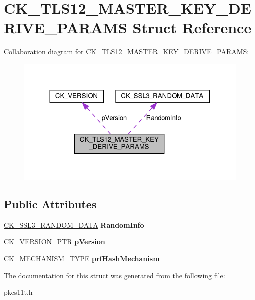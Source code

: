 \hypertarget{struct_c_k___t_l_s12___m_a_s_t_e_r___k_e_y___d_e_r_i_v_e___p_a_r_a_m_s}{}\section{C\+K\+\_\+\+T\+L\+S12\+\_\+\+M\+A\+S\+T\+E\+R\+\_\+\+K\+E\+Y\+\_\+\+D\+E\+R\+I\+V\+E\+\_\+\+P\+A\+R\+A\+MS Struct Reference}
\label{struct_c_k___t_l_s12___m_a_s_t_e_r___k_e_y___d_e_r_i_v_e___p_a_r_a_m_s}


Collaboration diagram for C\+K\+\_\+\+T\+L\+S12\+\_\+\+M\+A\+S\+T\+E\+R\+\_\+\+K\+E\+Y\+\_\+\+D\+E\+R\+I\+V\+E\+\_\+\+P\+A\+R\+A\+MS\+:
\nopagebreak
\begin{figure}[H]
\begin{center}
\leavevmode
\includegraphics[width=324pt]{struct_c_k___t_l_s12___m_a_s_t_e_r___k_e_y___d_e_r_i_v_e___p_a_r_a_m_s__coll__graph}
\end{center}
\end{figure}
\subsection*{Public Attributes}
\begin{DoxyCompactItemize}
\item 
\mbox{\label{struct_c_k___t_l_s12___m_a_s_t_e_r___k_e_y___d_e_r_i_v_e___p_a_r_a_m_s_ae97101511e1c04224a1bfbf2e92bfb95}} 
\hyperlink{struct_c_k___s_s_l3___r_a_n_d_o_m___d_a_t_a}{C\+K\+\_\+\+S\+S\+L3\+\_\+\+R\+A\+N\+D\+O\+M\+\_\+\+D\+A\+TA} {\bfseries Random\+Info}
\item 
\mbox{\label{struct_c_k___t_l_s12___m_a_s_t_e_r___k_e_y___d_e_r_i_v_e___p_a_r_a_m_s_a809b03bb337fc79492709421a1d0f280}} 
C\+K\+\_\+\+V\+E\+R\+S\+I\+O\+N\+\_\+\+P\+TR {\bfseries p\+Version}
\item 
\mbox{\label{struct_c_k___t_l_s12___m_a_s_t_e_r___k_e_y___d_e_r_i_v_e___p_a_r_a_m_s_a6c5f467ddb3f3b70be75e087181e8d90}} 
C\+K\+\_\+\+M\+E\+C\+H\+A\+N\+I\+S\+M\+\_\+\+T\+Y\+PE {\bfseries prf\+Hash\+Mechanism}
\end{DoxyCompactItemize}


The documentation for this struct was generated from the following file\+:\begin{DoxyCompactItemize}
\item 
pkcs11t.\+h\end{DoxyCompactItemize}
